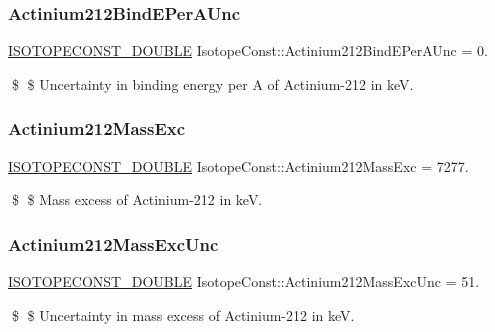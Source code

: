 \subsubsection{\texorpdfstring{Actinium212\+Bind\+E\+Per\+A\+Unc}{Actinium212BindEPerAUnc}}
{\footnotesize\ttfamily \mbox{\hyperlink{group___isotope_const-_macros_ga8f45a7272ce02c0b4c65c44636ed719a}{I\+S\+O\+T\+O\+P\+E\+C\+O\+N\+S\+T\+\_\+\+D\+O\+U\+B\+LE}} Isotope\+Const\+::\+Actinium212\+Bind\+E\+Per\+A\+Unc = 0.}

\$ \$ Uncertainty in binding energy per A of Actinium-\/212 in keV. \mbox{\label{group___isotope_const-_actinium-_ac212_gabdf39f0050cf8f3e949b2cc17bc176ce}} 
\subsubsection{\texorpdfstring{Actinium212\+Mass\+Exc}{Actinium212MassExc}}
{\footnotesize\ttfamily \mbox{\hyperlink{group___isotope_const-_macros_ga8f45a7272ce02c0b4c65c44636ed719a}{I\+S\+O\+T\+O\+P\+E\+C\+O\+N\+S\+T\+\_\+\+D\+O\+U\+B\+LE}} Isotope\+Const\+::\+Actinium212\+Mass\+Exc = 7277.}

\$ \$ Mass excess of Actinium-\/212 in keV. \mbox{\label{group___isotope_const-_actinium-_ac212_ga29416bcd2590360ddf8b22a4c3b97524}} 
\subsubsection{\texorpdfstring{Actinium212\+Mass\+Exc\+Unc}{Actinium212MassExcUnc}}
{\footnotesize\ttfamily \mbox{\hyperlink{group___isotope_const-_macros_ga8f45a7272ce02c0b4c65c44636ed719a}{I\+S\+O\+T\+O\+P\+E\+C\+O\+N\+S\+T\+\_\+\+D\+O\+U\+B\+LE}} Isotope\+Const\+::\+Actinium212\+Mass\+Exc\+Unc = 51.}

\$ \$ Uncertainty in mass excess of Actinium-\/212 in keV. \mbox{\label{group___isotope_const-_actinium-_ac212_ga8b5872df7e602bc41e21177f0e02a088}} 
